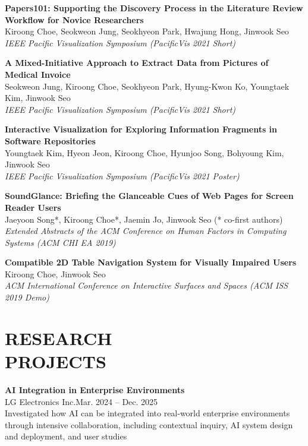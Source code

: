 \documentclass[margin]{res}
\begin{document}
\begin{resume}
\par
\textbf{Papers101: Supporting the Discovery Process in the Literature Review Workflow for Novice Researchers}\\
Kiroong Choe, Seokweon Jung, Seokhyeon Park, Hwajung Hong, Jinwook Seo\\
\textit{IEEE Pacific Visualization Symposium (PacificVis 2021 Short)}

\par
\textbf{A Mixed-Initiative Approach to Extract Data from Pictures of Medical Invoice}\\
Seokweon Jung, Kiroong Choe, Seokhyeon Park, Hyung-Kwon Ko, Youngtaek Kim, Jinwook Seo\\
\textit{IEEE Pacific Visualization Symposium (PacificVis 2021 Short)}

\par
\textbf{Interactive Visualization for Exploring Information Fragments in Software Repositories}\\
Youngtaek Kim, Hyeon Jeon, Kiroong Choe, Hyunjoo Song, Bohyoung Kim, Jinwook Seo\\
\textit{IEEE Pacific Visualization Symposium (PacificVis 2021 Poster)}

\par
\textbf{SoundGlance: Briefing the Glanceable Cues of Web Pages for Screen Reader Users}\\
Jaeyoon Song*, Kiroong Choe*, Jaemin Jo, Jinwook Seo (* co-first authors)\\
\textit{Extended Abstracts of the ACM Conference on Human Factors in Computing Systems (ACM CHI EA 2019)}

\par
\textbf{Compatible 2D Table Navigation System for Visually Impaired Users}\\
Kiroong Choe, Jinwook Seo\\
\textit{ACM International Conference on Interactive Surfaces and Spaces (ACM ISS 2019 Demo)}


\section{RESEARCH\\PROJECTS}

\textbf{AI Integration in Enterprise Environments}\\
LG Electronics Inc.\hfill Mar. 2024 -- Dec. 2025\\
Investigated how AI can be integrated into real-world enterprise environments through intensive collaboration, including contextual inquiry, AI system design and deployment, and user studies


\end{resume}
\end{document}
